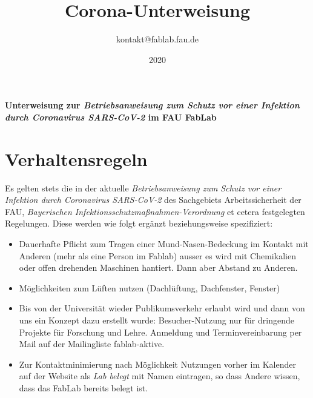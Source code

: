 \documentclass[13pt]{\basedir/fablab-document}
\date{2020}
\author{kontakt@fablab.fau.de}
\title{Corona-Unterweisung}
\begin{document}
\maketitle

\begin{center}
  \textbf{Unterweisung zur \emph{Betriebsanweisung zum Schutz vor einer Infektion durch Coronavirus SARS-CoV-2} im FAU FabLab}
\end{center}

\vbox{\vspace{1cm}}


\section{Verhaltensregeln}
Es gelten stets die in der aktuelle \emph{Betriebsanweisung zum Schutz vor einer Infektion durch Coronavirus SARS-CoV-2} des Sachgebiets Arbeitssicherheit der FAU, \emph{Bayerischen Infektionsschutzmaßnahmen-Verordnung} et cetera festgelegten Regelungen. Diese werden wie folgt ergänzt beziehungsweise spezifiziert: 

\begin{itemize}
  \item  Dauerhafte Pflicht zum Tragen einer Mund-Nasen-Bedeckung im Kontakt mit Anderen (mehr als eine Person im Fablab) ausser es wird mit Chemikalien oder offen drehenden Maschinen hantiert. Dann aber Abstand zu Anderen.
  \item  Möglichkeiten zum Lüften nutzen (Dachlüftung, Dachfenster, Fenster)
  \item  Bis von der Universität wieder Publikumsverkehr erlaubt wird und dann von uns ein Konzept dazu erstellt wurde: Besucher-Nutzung nur für dringende Projekte für Forschung und Lehre. Anmeldung und Terminvereinbarung per Mail auf der Mailingliste fablab-aktive.
  \item  Zur Kontaktminimierung nach Möglichkeit Nutzungen vorher im Kalender auf der Website als \emph{Lab belegt} mit Namen eintragen, so dass Andere wissen, dass das FabLab bereits belegt ist.
\end{itemize}

\end{document}
